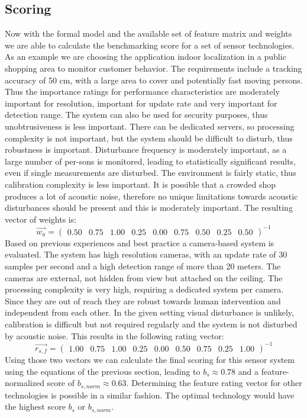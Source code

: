 \subsection{Scoring}
Now with the formal model and the available set of feature matrix and weights we are able to calculate the benchmarking score for a set of sensor technologies. As an example we are choosing the application indoor localization in a public shopping area to monitor customer behavior. The requirements include a tracking accuracy of 50 cm, with a large area to cover and potentially fast moving persons. Thus the importance ratings for performance characteristics are moderately important for resolution, important for update rate and very important for detection range. The system can also be used for security purposes, thus unobtrusiveness is less important. There can be dedicated servers, so processing complexity is not important, but the system should be difficult to disturb, thus robustness is important. Disturbance frequency is moderately important, as a large number of per-sons is monitored, leading to statistically significant results, even if single measurements are disturbed. The environment is fairly static, thus calibration complexity is less important. It is possible that a crowded shop produces a lot of acoustic noise, therefore no unique limitations towards acoustic disturbances should be present and this is moderately important. The resulting vector of weights is:
\begin{equation}
\overrightarrow{w_a}=
\begin{pmatrix}
0.50 & 0.75 & 1.00 & 0.25 & 0.00 & 0.75 & 0.50 & 0.25 & 0.50
\end{pmatrix}^{-1}
\end{equation}
Based on previous experiences and best practice a camera-based system is evaluated. The system has high resolution cameras, with an update rate of 30 samples per second and a high detection range of more than 20 meters. The cameras are external, not hidden from view but attached on the ceiling. The processing complexity is very high, requiring a dedicated system per camera. Since they are out of reach they are robust towards human intervention and independent from each other. In the given setting visual disturbance is unlikely, calibration is difficult but not required regularly and the system is not disturbed by acoustic noise. This results in the following rating vector:
\begin{equation}
\overrightarrow{r_{s,f}}=
\begin{pmatrix}
1.00 & 0.75 & 1.00 & 0.25 & 0.00 & 0.50 & 0.75 & 0.25 & 1.00
\end{pmatrix}^{-1}
\end{equation}
Using those two vectors we can calculate the final scoring for this sensor system using the equations of the previous section, leading to $b_s \approx 0.78$ and a feature-normalized score of $b_{s,norm} \approx 0.63$. Determining the feature rating vector for other technologies is possible in a similar fashion. The optimal technology would have the highest score $b_s$ or $b_{s,norm}$.
